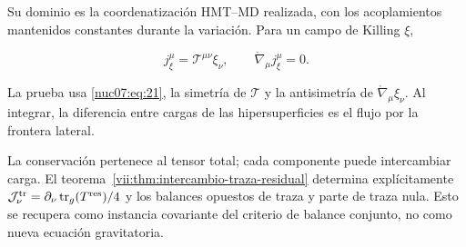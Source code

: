 Su dominio es la coordenatización HMT–MD realizada, con los acoplamientos mantenidos constantes durante la variación. Para un campo de Killing \(\xi\),

\begin{equation}
j^\mu_\xi=\mathcal T^{\mu\nu}\xi_\nu,\qquad
\mathring\nabla_\mu j^\mu_\xi=0.
\label{nuc07:eq:22}
\end{equation}

La prueba usa \eqref{nuc07:eq:21}, la simetría de \(\mathcal T\) y la antisimetría de \(\mathring\nabla_\mu\xi_\nu\). Al integrar, la diferencia entre cargas de las hipersuperficies es el flujo por la frontera lateral.

La conservación pertenece al tensor total; cada componente puede intercambiar carga. El teorema~\ref{vii:thm:intercambio-traza-residual} determina explícitamente \(\mathcal J^{\rm tr}_\nu=\partial_\nu\operatorname{tr}_g(T^{\rm res})/4\) y los balances opuestos de traza y parte de traza nula. Esto se recupera como instancia covariante del criterio de balance conjunto, no como nueva ecuación gravitatoria.
